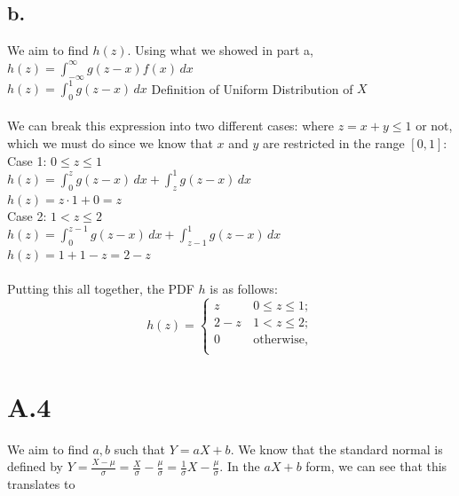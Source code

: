 \documentclass{article}
\newcommand{\1}{\mathbf{1}}
\begin{document}
{\subsection*{b.}
We aim to find $h(z)$. Using what we showed in part a, \\
$h(z) = \int_{-\infty}^{\infty} g(z - x) f(x) \,dx$ \\ 
$h(z) = \int_{0}^{1} g(z-x) \,dx$ \hfill Definition of Uniform Distribution of $X$ \\ \\
We can break this expression into two different cases: where $z = x + y \leq 1$ or not, which we must do since we know that $x$ and $y$ are restricted in the range $[0, 1]$: \\
Case 1: $0 \leq z \leq 1$ \\ 
$h(z) = \int_{0}^{z} g(z-x) \,dx + \int_{z}^{1} g(z-x) \,dx$ \\ 
$h(z) = z \cdot 1 + 0 = z$ \\
Case 2: $1 < z \leq 2$ \\ 
$h(z) = \int_{0}^{z-1} g(z-x) \,dx + \int_{z-1}^{1} g(z-x) \,dx$ \\ 
$h(z) = 1 + 1 - z = 2-z$ \\ \\
Putting this all together, the PDF $h$ is as follows:
\[
h\left(z\right)=\begin{cases}
z & \,0\le z\le1;\\
2 - z & \,1< z\le2;\\
0 & \,\mbox{otherwise,}\\
\end{cases}
\]

}

\section*{A.4}
{\Large 

We aim to find $a, b$ such that $Y = aX + b$. We know that the standard normal is defined by $Y = \frac{X - \mu}{\sigma} = \frac{X}{\sigma} - \frac{\mu}{\sigma} = \frac{1}{\sigma}X - \frac{\mu}{\sigma}$. In the $aX + b$ form, we can see that this translates to 

}
\end{document}
